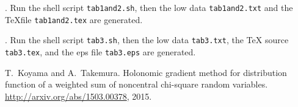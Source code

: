 \documentclass{article}
\begin{document}
\medskip{}\/.
Run the shell script {\tt tab1and2.sh}, then the low data {\tt tab1and2.txt} and 
the \TeX file {\tt tab1and2.tex} are generated.

\medskip{}\/.
Run the shell script {\tt tab3.sh}, then the low data {\tt tab3.txt}, 
the TeX source {\tt tab3.tex}, and the eps file {\tt tab3.eps} are generated.


\iftrue

\begin{thebibliography}{1}

T.~Koyama and A.~Takemura.
\newblock Holonomic gradient method for distribution function of a weighted sum
  of noncentral chi-square random variables.
\newblock \url{http://arxiv.org/abs/1503.00378}, 2015.

\end{thebibliography}

\else




\fi

\end{document}
